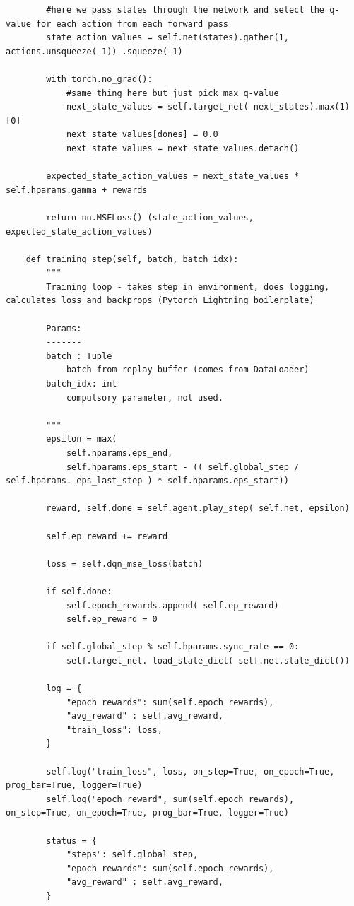 \documentclass[12pt]{article}
\begin{document}
\begin{addmargin}[-4em]{-4em}
\begin{multicols}{2}
\begin{verbatim}
        #here we pass states through the network and select the q-value for each action from each forward pass
        state_action_values = self.net(states).gather(1, actions.unsqueeze(-1)) .squeeze(-1)

        with torch.no_grad():
            #same thing here but just pick max q-value
            next_state_values = self.target_net( next_states).max(1)[0]
            next_state_values[dones] = 0.0
            next_state_values = next_state_values.detach()

        expected_state_action_values = next_state_values * self.hparams.gamma + rewards

        return nn.MSELoss() (state_action_values, expected_state_action_values)

    def training_step(self, batch, batch_idx):
        """
        Training loop - takes step in environment, does logging, calculates loss and backprops (Pytorch Lightning boilerplate)

        Params:
        -------
        batch : Tuple
            batch from replay buffer (comes from DataLoader)
        batch_idx: int
            compulsory parameter, not used. 

        """
        epsilon = max(
            self.hparams.eps_end,
            self.hparams.eps_start - (( self.global_step / self.hparams. eps_last_step ) * self.hparams.eps_start))

        reward, self.done = self.agent.play_step( self.net, epsilon)
        
        self.ep_reward += reward

        loss = self.dqn_mse_loss(batch)

        if self.done:
            self.epoch_rewards.append( self.ep_reward)
            self.ep_reward = 0

        if self.global_step % self.hparams.sync_rate == 0:
            self.target_net. load_state_dict( self.net.state_dict())

        log = {
            "epoch_rewards": sum(self.epoch_rewards),
            "avg_reward" : self.avg_reward,
            "train_loss": loss,
        }

        self.log("train_loss", loss, on_step=True, on_epoch=True, prog_bar=True, logger=True)
        self.log("epoch_reward", sum(self.epoch_rewards), on_step=True, on_epoch=True, prog_bar=True, logger=True)

        status = {
            "steps": self.global_step,
            "epoch_rewards": sum(self.epoch_rewards),
            "avg_reward" : self.avg_reward,
        }


\end{verbatim}
\end{multicols}
\end{addmargin}
\end{document}
